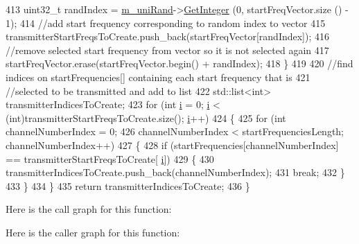 \begin{DoxyCode}
413       uint32\_t randIndex = \hyperlink{classns3_1_1TvSpectrumTransmitterHelper_ac0914f5455dbfa49826f0879635693e6}{m\_uniRand}->\hyperlink{classns3_1_1RandomVariableStream_a66cd94e6305ce7f000f1a9ff0fcb9aef}{GetInteger} (0, startFreqVector.size () - 1);
414       \textcolor{comment}{//add start frequency corresponding to random index to vector }
415       transmitterStartFreqsToCreate.push\_back(startFreqVector[randIndex]); 
416       \textcolor{comment}{//remove selected start frequency from vector so it is not selected again}
417       startFreqVector.erase(startFreqVector.begin() + randIndex); 
418     \}
419 
420   \textcolor{comment}{//find indices on startFrequencies[] containing each start frequency that is }
421   \textcolor{comment}{//selected to be transmitted and add to list}
422   std::list<int> transmitterIndicesToCreate;
423   \textcolor{keywordflow}{for} (\textcolor{keywordtype}{int} \hyperlink{bernuolliDistribution_8m_a6f6ccfcf58b31cb6412107d9d5281426}{i} = 0; \hyperlink{bernuolliDistribution_8m_a6f6ccfcf58b31cb6412107d9d5281426}{i} < (int)transmitterStartFreqsToCreate.size(); \hyperlink{bernuolliDistribution_8m_a6f6ccfcf58b31cb6412107d9d5281426}{i}++)
424     \{
425       \textcolor{keywordflow}{for} (\textcolor{keywordtype}{int} channelNumberIndex = 0; 
426            channelNumberIndex < startFrequenciesLength; channelNumberIndex++)
427         \{
428           \textcolor{keywordflow}{if} (startFrequencies[channelNumberIndex] == transmitterStartFreqsToCreate[
      \hyperlink{bernuolliDistribution_8m_a6f6ccfcf58b31cb6412107d9d5281426}{i}])
429             \{
430               transmitterIndicesToCreate.push\_back(channelNumberIndex);
431               \textcolor{keywordflow}{break};
432             \}
433         \}
434     \}
435   \textcolor{keywordflow}{return} transmitterIndicesToCreate;
436 \}
\end{DoxyCode}


Here is the call graph for this function\+:




Here is the caller graph for this function\+:


